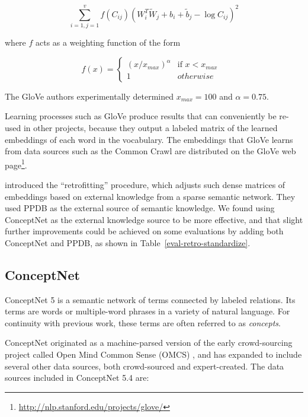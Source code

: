 \documentclass[letterpaper]{article}
\begin{document}
$$
\sum_{i=1,j=1}^v
  f \left( C_{ij} \right)
  \left( W_i^T \tilde{W}_j + b_i + \tilde{b}_j - \log{C_{ij}} \right)^2
$$

where $f$ acts as a weighting function of the form

$$
f \left( x \right) =
  \begin{cases}
    \left( x / x_{max} \right)^\alpha & \text{if $x < x_{max}$ } \\
    1 & otherwise
  \end{cases}
$$

The GloVe authors experimentally determined $x_{max}=100$ and $\alpha=0.75$.

Learning processes such as GloVe produce results that can conveniently be
re-used in other projects, because they output a labeled matrix of the learned
embeddings of each word in the vocabulary. The embeddings that GloVe learns
from data sources such as the Common Crawl are distributed on the GloVe web
page\footnote{\url{http://nlp.stanford.edu/projects/glove/}}.

introduced the ``retrofitting'' procedure, which adjusts such dense matrices of
embeddings based on external knowledge from a sparse semantic network.
They used PPDB \cite{ganitkevitch2013ppdb} as
the external source of semantic knowledge. We found using ConceptNet as the
external knowledge source to be more effective, and that slight further
improvements could be achieved on some evaluations by adding both
ConceptNet and PPDB, as shown in Table~\ref{eval-retro-standardize}.

\subsection{ConceptNet}
ConceptNet 5 \cite{speer2012conceptnet} is a semantic network of terms
connected by labeled relations. Its terms are words or multiple-word phrases
in a variety of natural language. For continuity with previous work,
these terms are often referred to as {\em concepts}.

ConceptNet originated as a machine-parsed version of the early crowd-sourcing
project called Open Mind Common Sense (OMCS) \cite{singh2002omcs}, and has expanded
to include several other data sources, both crowd-sourced and expert-created.
The data sources included in ConceptNet 5.4 are:
\end{document}
